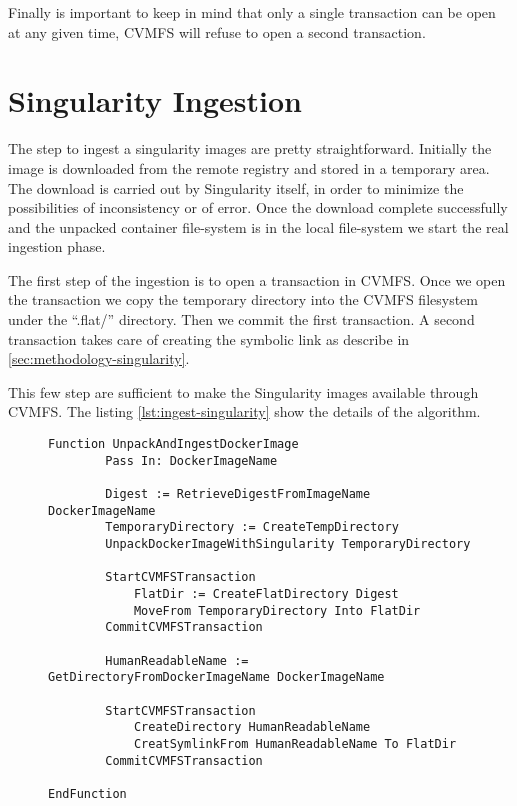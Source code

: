 Finally is important to keep in mind that only a single transaction can be open
at any given time, CVMFS will refuse to open a second transaction. 

\section{Singularity Ingestion}

The step to ingest a singularity images are pretty straightforward. Initially
the image is downloaded from the remote registry and stored in a temporary
area. The download is carried out by Singularity itself, in order to minimize
the possibilities of inconsistency or of error. Once the download complete
successfully and the unpacked container file-system is in the local file-system
we start the real ingestion phase.

The first step of the ingestion is to open a transaction in CVMFS. Once we open
the transaction we copy the temporary directory into the CVMFS filesystem under
the “.flat/” directory. Then we commit the first transaction. A second
transaction takes care of creating the symbolic link as describe in
\ref{sec:methodology-singularity}.

This few step are sufficient to make the Singularity images available through
CVMFS. The listing \ref{lst:ingest-singularity} show the details of the
algorithm.

\begin{figure}
\begin{lstlisting}[caption={Algorithm to unpack a Docker image with Singularity and ingest it into CVMFS}, label={lst:ingest-singularity}]
Function UnpackAndIngestDockerImage
        Pass In: DockerImageName
        
        Digest := RetrieveDigestFromImageName DockerImageName
        TemporaryDirectory := CreateTempDirectory
        UnpackDockerImageWithSingularity TemporaryDirectory

        StartCVMFSTransaction
            FlatDir := CreateFlatDirectory Digest
            MoveFrom TemporaryDirectory Into FlatDir
        CommitCVMFSTransaction

        HumanReadableName := GetDirectoryFromDockerImageName DockerImageName
        
        StartCVMFSTransaction
            CreateDirectory HumanReadableName
            CreatSymlinkFrom HumanReadableName To FlatDir
        CommitCVMFSTransaction

EndFunction
\end{lstlisting}
\end{figure}

